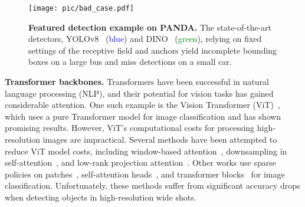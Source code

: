 \begin{figure}[!]
\centering
	\texttt{[image: pic/bad\_case.pdf]}
        \vspace{-17pt}
	\caption{\textbf{Featured detection example on PANDA.} 
    The state-of-the-art detectors, YOLOv8~\cite{yolov8} (\textcolor{blue}{blue}) and DINO~\cite{zhang2022dino} (\textcolor{green}{green}), relying on fixed settings of the receptive field and anchors yield incomplete bounding boxes on a large bus and miss detections on a small car. 
 }
    \vspace{-12pt}
	\label{fig:bad_case}	
\end{figure}



\vspace{2mm}\noindent\textbf{Transformer backbones.}
Transformers have been successful in natural language processing (NLP), and their potential for vision tasks has gained considerable attention. One such example is the Vision Transformer (ViT)~\cite{dosovitskiy2020image}, which uses a pure Transformer model for image classification and has shown promising results. However, ViT's computational costs for processing high-resolution images are impractical. Several methods have been attempted to reduce ViT model costs, including window-based attention~\cite{liu2021swin}, downsampling in self-attention~\cite{wang2021pyramid, wu2021cvt}, and low-rank projection attention~\cite{xiong2021nystromformer}. 
Other works use sparse policies on patches~\citep{rao2021dynamicvit}, self-attention heads~\citep{meng2022adavit}, and transformer blocks~\citep{meng2022adavit} for image classification.
Unfortunately, these methods suffer from significant accuracy drops when detecting objects in high-resolution wide shots.
